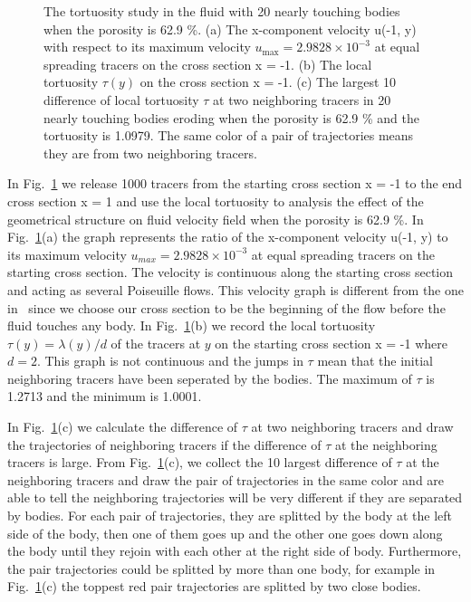 \documentclass[preprint, 10pt]{elsarticle}
\begin{document}
\begin{figure}[H]
\begin{subfigure}[b]{0.5\textwidth}
\caption{}
\end{subfigure}
\caption{\label{fig:Eroding20tort} The tortuosity study in the fluid with 
20 nearly touching bodies when the porosity is 62.9 \%.
(a) The 
x-component velocity u(-1, y) with respect to its maximum velocity
$u_{\max}=2.9828
\times 10^{-3}$ at equal spreading tracers on the cross section x = -1. 
(b) The local tortuosity $\tau(y)$ on the cross section x = -1. 
(c) The largest 10 difference of 
local tortuosity $\tau$ at two neighboring tracers in
 20 nearly touching bodies eroding when the porosity is 62.9 \% 
and the tortuosity is 1.0979. The same color of a pair of trajectories 
means they are from two neighboring tracers.}
\end{figure}

{\color{red}
In Fig.~\ref{fig:Eroding20tort} we release 1000 tracers 
from the starting cross section x = -1 to 
the end cross section x = 1 and 
use the local tortuosity to analysis the effect
of the geometrical structure on fluid velocity field when the porosity is 62.9 \%.
In Fig.~\ref{fig:Eroding20tort}(a) the graph represents the ratio of the
x-component velocity u(-1, y) to its maximum velocity $u_{max}=2.9828
\times 10^{-3}$ at equal spreading tracers on the starting cross section.
The velocity is continuous along the starting cross section and
acting as several Poiseuille flows. This velocity graph is different
from the one in~\cite{matyka2008tortuosity} since we choose our cross
section to be the beginning of the flow before the fluid touches any
body. In Fig.~\ref{fig:Eroding20tort}(b) we record the local tortuosity
$\tau(y)=\lambda(y)/d$
of the tracers at $y$ on the starting cross section x = -1 
where $d = 2$.
This graph is not continuous 
and the jumps in $\tau$ mean that the initial neighboring tracers have been
seperated by the bodies. 
The maximum of $\tau$ is 1.2713 and the minimum is 1.0001.
}



{\color{red}
In Fig.~\ref{fig:Eroding20tort}(c) we calculate the difference of 
$\tau$ at two neighboring tracers 
and draw the trajectories of neighboring tracers
if the difference of $\tau$ at the neighboring tracers is large. 
From Fig.~\ref{fig:Eroding20tort}(c), we collect the 10 largest difference of $\tau$ 
at the neighboring tracers and 
draw the pair of trajectories in the same color and 
are able to tell the neighboring trajectories will be very 
different if they are separated by bodies.
For each pair of trajectories, 
they are splitted by the body at the left side of the body, then
one of them goes up and the other one goes down along the body 
until they rejoin with each other at the right side of body.  
Furthermore, the pair trajectories could be splitted by more than one body, 
for example in Fig.~\ref{fig:Eroding20tort}(c) the toppest red pair trajectories 
are splitted by two close bodies.
}
\end{document}
